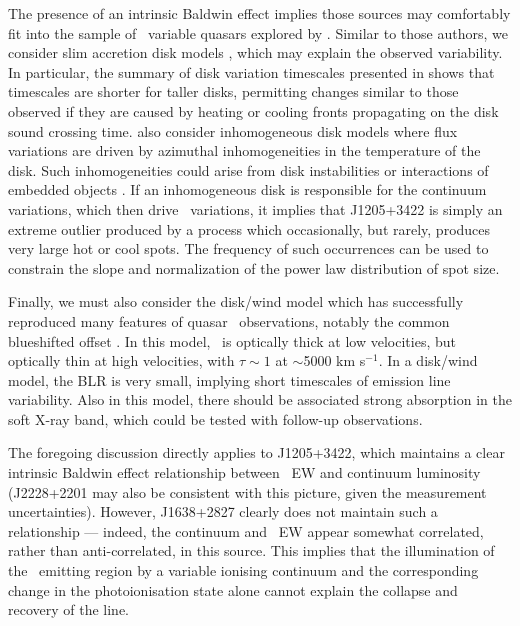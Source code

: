 \documentclass[fleqn,usenatbib]{mnras}
\begin{document}
The presence of an intrinsic Baldwin effect implies those sources may
comfortably fit into the sample of \civ\ variable quasars explored by
\citet{Dyer2019}. Similar to those authors, we consider slim accretion
disk models \citep[e.g.,][]{Abramowicz1988}, which may explain the
observed variability. In particular, the summary of disk variation
timescales presented in \citet{Stern2018} shows that timescales are
shorter for taller disks, permitting changes similar to those observed
if they are caused by heating or cooling fronts propagating on the
disk sound crossing time. \citet{Dyer2019} also consider inhomogeneous
disk models \citep[e.g.,][]{DexterAgol2011} where flux variations are
driven by azimuthal inhomogeneities in the temperature of the
disk. Such inhomogeneities could arise from disk instabilities
\citep[e.g.,][]{LightmanEardley1974} or interactions of embedded
objects \citep[e.g.,][]{McKernan2014, McKernan2018}. If an
inhomogeneous disk is responsible for the continuum variations, which
then drive \civ\ variations, it implies that J1205+3422 is simply an
extreme outlier produced by a process which occasionally, but rarely,
produces very large hot or cool spots. The frequency of such
occurrences can be used to constrain the slope and normalization of
the power law distribution of spot size.

Finally, we must also consider the disk/wind model which has
successfully reproduced many features of quasar \civ\ observations,
notably the common blueshifted offset \citep[e.g.,][]{Murray1995}. In
this model, \civ\ is optically thick at low velocities, but optically
thin at high velocities, with $\tau \sim 1$ at $\sim$5000 km
s$^{-1}$. In a disk/wind model, the BLR is very small, implying short
timescales of emission line variability. Also in this model, there
should be associated strong absorption in the soft X-ray band, which
could be tested with follow-up observations.

The foregoing discussion directly applies to J1205+3422, which
maintains a clear intrinsic Baldwin effect relationship between \civ\
EW and continuum luminosity (J2228+2201 may also be consistent with
this picture, given the measurement uncertainties).  However,
J1638+2827 clearly does not maintain such a relationship --- indeed,
the continuum and \civ\ EW appear somewhat correlated, rather than
anti-correlated, in this source. This implies that the illumination of
the \civ\ emitting region by a variable ionising continuum and the
corresponding change in the photoionisation state alone cannot explain
the collapse and recovery of the line.
\end{document}
